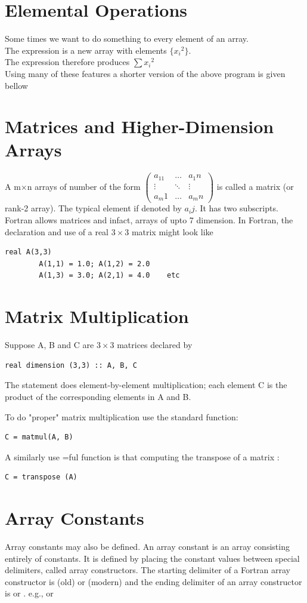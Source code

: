 \documentclass[class=book,crop=false]{standalone}
\begin{document}
\section{Elemental Operations}
Some times we want to do something to every element of an array.\\The expression  is a new array with elements $ \{{x_i}^2\} $.\\
The expression  therefore produces $ \sum {x_i}^2 $\\
Using many of these features a shorter version of the above program is given bellow

\section{Matrices and Higher-Dimension Arrays}
A m$ \times $n arrays of number of the form $ \begin{pmatrix}
        a_11 &\dots & a_1n\\
        \vdots & \ddots & \vdots\\
        a_m1 & \dots & a_mn
    \end{pmatrix} $ is called a matrix (or rank-2 array). The typical element if denoted by $ a_ij $. It has two subscripts. Fortran allows matrices and infact, arrays of upto 7 dimension. In Fortran, the declaration and use of a real $ 3\times 3 $ matrix might look like\begin{lstlisting}[numbers=none]
        real A(3,3)
        A(1,1) = 1.0; A(1,2) = 2.0
        A(1,3) = 3.0; A(2,1) = 4.0    etc
    \end{lstlisting}
\section{Matrix Multiplication} Suppose A, B and C are $ 3\times3 $ matrices declared by\begin{lstlisting}[numbers=none]
    real dimension (3,3) :: A, B, C
\end{lstlisting} 
The statement  does element-by-element multiplication; each element C is the product of the corresponding elements in A and B.

To do "proper" matrix multiplication use the standard  function: \begin{lstlisting}[numbers=none]
    C = matmul(A, B)
\end{lstlisting}
A similarly use =ful function is that computing the transpose of a matrix :
\begin{lstlisting}[numbers=none]
    C = transpose (A)
\end{lstlisting}
\section{Array Constants} Array constants may also be defined. An array constant is an array consisting entirely of constants. It is defined by placing the constant values between special delimiters, called array constructors. The starting delimiter of a Fortran array constructor is \code{(/} (old) or \code{[} (modern) and the ending delimiter of an array constructor is \code{/)} or \code{]}. e.g.,  or \code{[ 1, 2, 3, 4 ]}
\end{document}
